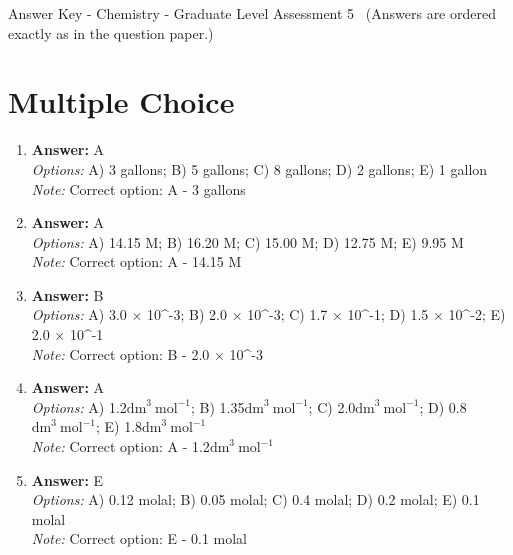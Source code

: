 \documentclass[12pt]{article}
\begin{document}
\begin{center}
Answer Key - Chemistry - Graduate Level Assessment 5 \
\small (Answers are ordered exactly as in the question paper.)
\end{center}

\section*{Multiple Choice}
\begin{enumerate}[label=\arabic*.]
\item \textbf{Answer:} A
\\ \textit{Options:} A) 3 gallons; B) 5 gallons; C) 8 gallons; D) 2 gallons; E) 1 gallon
\\ \textit{Note:} Correct option: A - 3 gallons
\item \textbf{Answer:} A
\\ \textit{Options:} A) 14.15 M; B) 16.20 M; C) 15.00 M; D) 12.75 M; E) 9.95 M
\\ \textit{Note:} Correct option: A - 14.15 M
\item \textbf{Answer:} B
\\ \textit{Options:} A) 3.0 \ensuremath{\times} 10^-3; B) 2.0 \ensuremath{\times} 10^-3; C) 1.7 \ensuremath{\times} 10^-1; D) 1.5 \ensuremath{\times} 10^-2; E) 2.0 \ensuremath{\times} 10^-1
\\ \textit{Note:} Correct option: B - 2.0 \ensuremath{\times} 10^-3
\item \textbf{Answer:} A
\\ \textit{Options:} A) 1.2$\mathrm{dm}^3 \mathrm{~mol}^{-1}$; B) 1.35$\mathrm{dm}^3 \mathrm{~mol}^{-1}$; C) 2.0$\mathrm{dm}^3 \mathrm{~mol}^{-1}$; D) 0.8$\mathrm{dm}^3 \mathrm{~mol}^{-1}$; E) 1.8$\mathrm{dm}^3 \mathrm{~mol}^{-1}$
\\ \textit{Note:} Correct option: A - 1.2$\mathrm{dm}^3 \mathrm{~mol}^{-1}$
\item \textbf{Answer:} E
\\ \textit{Options:} A) 0.12 molal; B) 0.05 molal; C) 0.4 molal; D) 0.2 molal; E) 0.1 molal
\\ \textit{Note:} Correct option: E - 0.1 molal
\end{enumerate}
\end{document}
